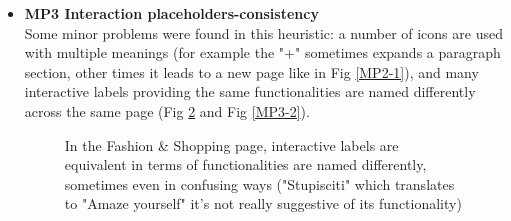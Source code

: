 \begin{itemize}
\begin{figure}[!ht]
\begin{minipage}{\linewidth}
                \label{MP2-2}
            \end{minipage}
        \end{figure}
    \item \textbf{MP3 Interaction placeholders-consistency}\\
        Some minor problems were found in this heuristic:
        a number of icons are used with multiple meanings (for example the "+" sometimes expands a paragraph section, other times it leads to a new page like in Fig \ref{MP2-1}), and many interactive labels providing the same functionalities are named differently across the same page (Fig \ref{MP3-1} and Fig \ref{MP3-2}).
        \begin{figure}[!ht]
            \begin{minipage}{\linewidth}
                \centering
                \captionsetup{justification=centering}
                \caption{In the Fashion \& Shopping page, interactive labels are equivalent in terms of functionalities are named differently, sometimes even in confusing ways ("Stupisciti" which translates to "Amaze yourself" it's not really suggestive of its functionality)}
                \label{MP3-1}
            \end{minipage}
        \end{figure}
        \begin{figure}[!ht]
            \begin{minipage}{\linewidth}
                \centering

\end{minipage}
\end{figure}
\end{itemize}
